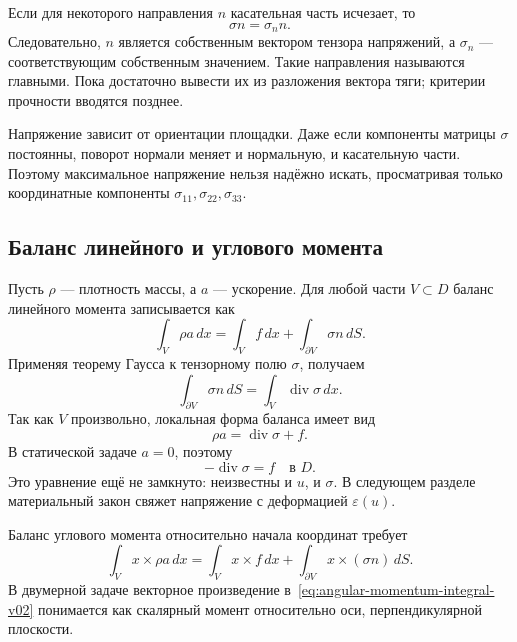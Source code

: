 Если для некоторого направления $n$ касательная часть исчезает, то
\[
\sigma n=\sigma_n n.
\]
Следовательно, $n$ является собственным вектором тензора напряжений, а $\sigma_n$ --- соответствующим собственным значением. Такие направления называются главными. Пока достаточно вывести их из разложения вектора тяги; критерии прочности вводятся позднее.

Напряжение зависит от ориентации площадки. Даже если компоненты матрицы $\sigma$ постоянны, поворот нормали меняет и нормальную, и касательную части. Поэтому максимальное напряжение нельзя надёжно искать, просматривая только координатные компоненты $\sigma_{11},\sigma_{22},\sigma_{33}$.

\subsection{Баланс линейного и углового момента}

Пусть $\rho$ --- плотность массы, а $a$ --- ускорение. Для любой части $V\subset D$ баланс линейного момента записывается как
\begin{equation}
\label{eq:linear-momentum-integral-v02}
\int_V \rho a\,dx
=
\int_V f\,dx
+
\int_{\partial V}\sigma n\,dS.
\end{equation}
Применяя теорему Гаусса к тензорному полю $\sigma$, получаем
\begin{equation}
\label{eq:stress-divergence-theorem-v02}
\int_{\partial V}\sigma n\,dS
=
\int_V \operatorname{div}\sigma\,dx.
\end{equation}
Так как $V$ произвольно, локальная форма баланса имеет вид
\begin{equation}
\label{eq:linear-momentum-local-v02}
\rho a=\operatorname{div}\sigma+f.
\end{equation}
В статической задаче $a=0$, поэтому
\begin{equation}
\label{eq:static-equilibrium-v02}
-\operatorname{div}\sigma=f
\quad\text{в }D.
\end{equation}
Это уравнение ещё не замкнуто: неизвестны и $u$, и $\sigma$. В следующем разделе материальный закон свяжет напряжение с деформацией $\varepsilon(u)$.

Баланс углового момента относительно начала координат требует
\begin{equation}
\label{eq:angular-momentum-integral-v02}
\int_V x\times\rho a\,dx
=
\int_V x\times f\,dx
+
\int_{\partial V}x\times(\sigma n)\,dS.
\end{equation}
В двумерной задаче векторное произведение в~\eqref{eq:angular-momentum-integral-v02} понимается как скалярный момент относительно оси, перпендикулярной плоскости.

